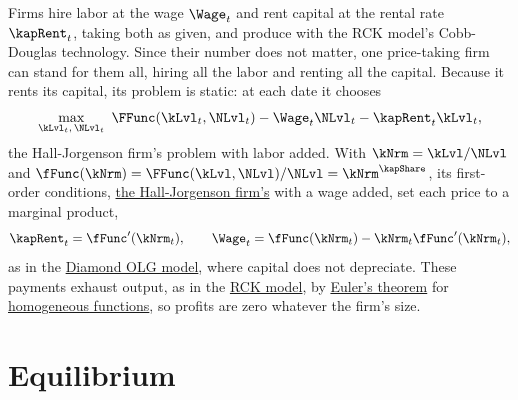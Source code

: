 \documentclass{econark}
\begin{document}
Firms hire labor at the wage $\Wage_{t}$ and rent capital at the rental rate $\kapRent_{t}$, taking both as given, and produce with the RCK model's Cobb-Douglas technology. Since their number does not matter, one price-taking firm can stand for them all, hiring all the labor and renting all the capital. Because it rents its capital, its problem is static: at each date it chooses
\begin{equation*}
  \max_{\kLvl_{t},\,\NLvl_{t}}\ \FFunc(\kLvl_{t},\NLvl_{t}) - \Wage_{t}\NLvl_{t} - \kapRent_{t}\kLvl_{t},
\end{equation*}
the Hall-Jorgenson firm's problem with labor added. With $\kNrm = \kLvl/\NLvl$ and $\fFunc(\kNrm) = \FFunc(\kLvl,\NLvl)/\NLvl = \kNrm^{\kapShare}$, its first-order conditions, \href{https://intertemporal-choice.github.io/content/investment/halljorgenson/\#eq-khj}{the Hall-Jorgenson firm's} with a wage added, set each price to a marginal product,
\begin{equation}
  \kapRent_{t} = \fFunc^{\prime}(\kNrm_{t}), \qquad \Wage_{t} = \fFunc(\kNrm_{t}) - \kNrm_{t}\fFunc^{\prime}(\kNrm_{t}), \label{eq:DecRCK-prices}
\end{equation}
as in the \href{https://intertemporal-choice.github.io/content/consumption/olgmodel/\#eq-reqfp}{Diamond OLG model}, where capital does not depreciate. These payments exhaust output, as in the \href{https://intertemporal-choice.github.io/content/growth/ramseycasskoopmans/\#eq-rck-outputexhausted}{RCK model}, by \href{https://intertemporal-choice.github.io/content/appendices/mathematical/mathfactslist/\#fact-eulerstheorem}{Euler's theorem} for \href{https://en.wikipedia.org/wiki/Homogeneous_function\#Euler's_theorem}{homogeneous functions}, so profits are zero whatever the firm's size.

\section{Equilibrium}
\end{document}
